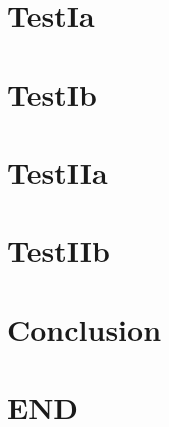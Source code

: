 \documentclass[a5paper,12pt,pdftex]{scrartcl}
\begin{document}
\section{TestIa }
\vspace*{3cm}
\section{TestIb }
\vspace*{3cm}
\newpage
\section{TestIIa }
\vspace*{3cm}
\section{TestIIb }
\vspace*{3cm}
\section{Conclusion }
\vspace*{3cm}
\section{END }
\vspace*{3cm}
\end{document}
